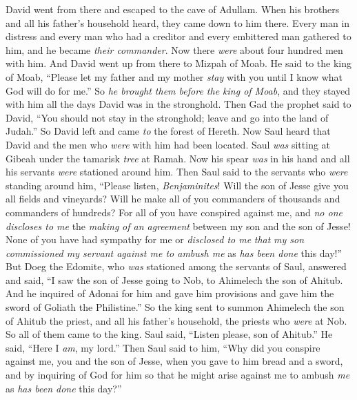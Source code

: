 \begin{biblechapter} %
 David went from there and escaped to the cave of Adullam. When his brothers and all his father’s household heard, they came down to him there.
\verse Every man in distress and every man who had a creditor and every embittered man gathered to him, and he became \textit{their commander}. Now there \textit{were} about four hundred men with him.
\verse And David went up from there to Mizpah of Moab. He said to the king of Moab, “Please let my father and my mother \textit{stay} with you until I know what God will do for me.”
\verse So \textit{he brought them before the king of Moab}, and they stayed with him all the days David was in the stronghold.
\verse Then Gad the prophet said to David, “You should not stay in the stronghold; leave and go into the land of Judah.” So David left and came \textit{to} the forest of Hereth.
\verse Now Saul heard that David and the men who \textit{were} with him had been located. Saul \textit{was} sitting at Gibeah under the tamarisk \textit{tree} at Ramah. Now his spear \textit{was} in his hand and all his servants \textit{were} stationed around him.
\verse Then Saul said to the servants who \textit{were} standing around him, “Please listen, \textit{Benjaminites}! Will the son of Jesse give you all fields and vineyards? Will he make all of you commanders of thousands and commanders of hundreds?
\verse For all of you have conspired against me, and \textit{no one discloses to me} the \textit{making} \textit{of an agreement} between my son and the son of Jesse! None of you have had sympathy for me or \textit{disclosed to me} \textit{that} \textit{my son commissioned my servant against me to ambush me} as \textit{has been done} this day!”
\verse But Doeg the Edomite, who \textit{was} stationed among the servants of Saul, answered and said, “I saw the son of Jesse going to Nob, to Ahimelech the son of Ahitub.
\verse And he inquired of Adonai for him and gave him provisions and gave him the sword of Goliath the Philistine.”
\verse So the king sent to summon Ahimelech the son of Ahitub the priest, and all his father’s household, the priests who \textit{were} at Nob. So all of them came to the king.
\verse Saul said, “Listen please, son of Ahitub.” He said, “Here I \textit{am}, my lord.”
\verse Then Saul said to him, “Why did you conspire against me, you and the son of Jesse, when you gave to him bread and a sword, and by inquiring of God for him so that he might arise against me to ambush \textit{me} as \textit{has been done} this day?”

\end{biblechapter}

